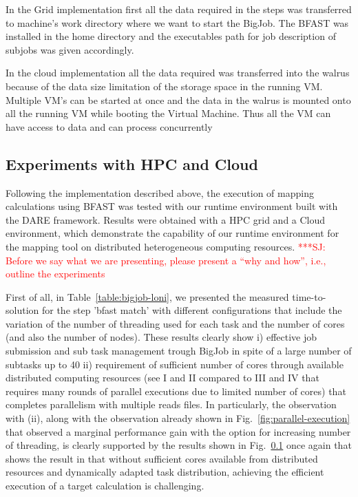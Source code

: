 \documentclass[12pt]{article}
\newcommand{\jhanote}[1]{ {\textcolor{red}     {***SJ: #1}}}
\newcommand{\jhanote}[1]{}
\begin{document}
In the Grid implementation first all the data required in the steps was transferred to machine's  work 
directory where we want to start the BigJob. The BFAST was installed in the home directory and the
executables path for job description of subjobs was given accordingly.

In the cloud implementation all the data required was transferred into the walrus because of the data size limitation of the storage space in the
running VM. Multiple VM's can be started at once and the data in the walrus is mounted onto all the running VM
while booting the Virtual Machine. Thus all the VM can have access to data and can process concurrently

\subsection{Experiments with HPC and Cloud}

Following the implementation described above, the execution of mapping calculations using BFAST was tested with our runtime environment built with the DARE framework.   Results were obtained with a HPC grid and a Cloud environment, which demonstrate the capability of our runtime environment for the mapping tool on distributed heterogeneous computing resources. \jhanote{Before we say what we are presenting, please present a ``why and how'', i.e., outline the experiments} 

First of all, in Table~\ref{table:bigjob-loni}, we presented the measured time-to-solution for the step 'bfast match' with different configurations that include the variation of the number of threading used for each task and the number of cores (and also the number of nodes).   These results clearly show i) effective job submission and sub task management trough BigJob in spite of a large number of subtasks up to 40 ii) requirement of sufficient number of cores through available distributed computing resources (see I and II compared to III and IV that requires many rounds of parallel executions due to limited number of cores) that completes parallelism with multiple reads files.  In particularly, the observation with (ii), along with the observation already shown in Fig.~\ref{fig:parallel-execution} that observed a marginal performance gain with the option for increasing number of threading, is clearly supported by the results shown in Fig.~\ref{} once again that shows the result in that without sufficient cores available from distributed resources and dynamically adapted task distribution, achieving the efficient execution of a target calculation is challenging.
\end{document}
